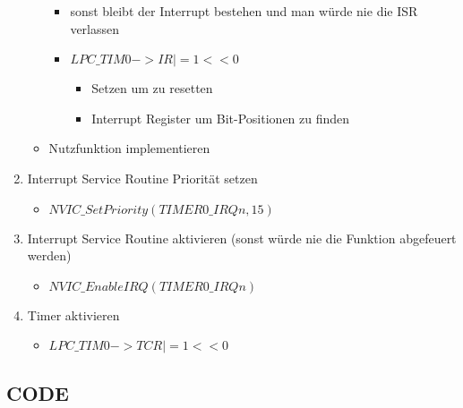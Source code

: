 \documentclass[11pt,a4paper,draft]{article}
\begin{document}
\begin{enumerate}
\begin{itemize}
\begin{itemize}
\item sonst bleibt der Interrupt bestehen und man würde nie die ISR verlassen
\item $LPC\_TIM0->IR |=1<<0$
\begin{itemize}
\item Setzen um zu resetten	
\item Interrupt Register um Bit-Positionen zu finden
\end{itemize}
\end{itemize}
\item Nutzfunktion implementieren
\end{itemize}
\item Interrupt Service Routine Priorität setzen
\begin{itemize}
\item $NVIC\_SetPriority(TIMER0\_IRQn,15)$
\end{itemize}	
\item Interrupt Service Routine aktivieren (sonst würde nie die Funktion abgefeuert werden)
\begin{itemize}
\item $NVIC\_EnableIRQ(TIMER0\_IRQn)$
\end{itemize}
\item Timer aktivieren
\begin{itemize}
\item$ LPC\_TIM0->TCR |=1<<0$
\end{itemize}
\end{enumerate}
\subsection{CODE}
\end{document}
